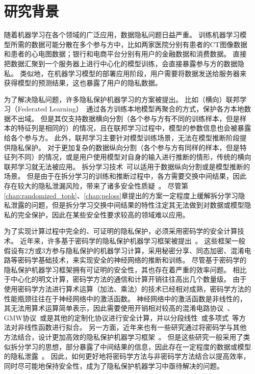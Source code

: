 \section{研究背景}
随着机器学习在各个领域的广泛应用，数据隐私问题日益严重。
%
训练机器学习模型所需的数据可能分散在多个参与方中，比如两家医院分别有患者的CT图像数据和患者的心电图数据；银行和电商平台分别有用户的金融数据和消费数据。
%
直接把数据汇聚到一个服务器上进行中心化的模型训练，会直接暴露参与方的数据隐私。
%
类似地，在机器学习模型的部署应用阶段，用户需要将数据发送给服务器来获得模型的预测结果，这也暴露了用户的隐私数据。

%
为了解决隐私问题，许多隐私保护机器学习的方案被提出。
%
比如（横向）联邦学习（Federated Learning）~\cite{yangqiang2019federated,mcmahan_2017_fedavg}通过各方训练本地模型再聚合的方式，保护各方本地数据不出域。
但是其仅支持数据横向分割（各个参与方有不同的训练样本，但是样本的特征列是相同的）的情况，且在联邦学习过程中，模型的参数信息也会被暴露给各个参与方。
%
此外，联邦学习主要针对模型训练场景，无法在模型推断阶段提供隐私保护。
%
对于更加复杂的数据纵向分割（各个参与方有同样的样本，但是特征列不同）的情况，或是用户使用模型对自身的输入进行推断的情形，传统的横向联邦学习就无法被应用。
%
拆分学习技术~\cite{vepakomma2018split}可以适用于数据纵向分割或是模型推断的场景。
但是由于在拆分学习的训练和推断过程中，各方需要交换中间结果，因此存在较大的隐私泄漏风险，带来了诸多安全性质疑~\cite{abuadbba2020can_split,hezecheng_2019_model_inversion_attack}。
尽管第\ref{chap:randomized_topk}、\ref{chap:peloss}章提出的方案一定程度上缓解拆分学习隐私泄露的问题，但是拆分学习交换中间结果的特性注定其无法做到对数据或模型隐私的完全保护，因此在某些安全性要求较高的领域难以应用。

为了实现计算过程中完全的、可证明的隐私保护，必须采用密码学的安全计算技术。
%
近年来，许多基于密码学的隐私保护机器学习框架被提出~\cite{mohassel2017secureml,wagh2019securenn,mohassel2018aby3}。
%
这些框架一般假设有2方或3方参与隐私保护的机器学习计算，采用秘密分享、同态加密、混淆电路等密码学基础技术，来实现安全的神经网络的推断和训练。
%
尽管基于密码学的隐私保护机器学习框架拥有可证明的安全性，其也存在着严重的效率问题。
相比于中心化的明文计算，密码学方法的通信和计算开销往往高出几个数量级。
%
由于使用密码学方法进行算术运算（加法、乘法）的技术已经相对成熟，密码学方法的性能瓶颈往往在于神经网络中的激活函数。
%
神经网络中的激活函数是非线性的，其无法用算术运算简单表示，因此需要使用开销相对较高的混淆电路协议~\cite{yao1986gc}、GMW协议~\cite{gmw_1987}或是其他的定制化协议进行安全计算，并以分段线性~\cite{mohassel2017secureml}或多项式~\cite{gilad2016cryptonets}等方法对非线性函数进行拟合。
%
另一方面，近年来也有一些研究通过将密码学与其他方法结合，设计更加高效的隐私保护机器学习框架~\cite{zhangqiao_2018_gelu_net,xiepeichen_2019_bayhenn,zhou_2022_codesign}。
%
但是这些研究一般采用了类似拆分学习的思想，部分暴露了中间结果的信息，因此存在一定程度的数据或模型的隐私泄露~\cite{wong_2020_lwe_model,abuadbba2020can_split,hezecheng_2019_model_inversion_attack}。
%
因此，如何更好地将密码学方法与非密码学方法结合以提高效率，同时尽可能地保持安全性，成为了隐私保护机器学习中亟待解决的问题。
